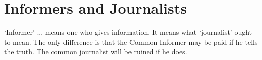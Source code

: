 \section{Informers and Journalists}

\begin{quotex}
`Informer' ... means one who gives information. It means what `journalist' ought to mean. The only difference is that the Common Informer may be paid if he tells the truth. The common journalist will be ruined if he does.
\end{quotex}


